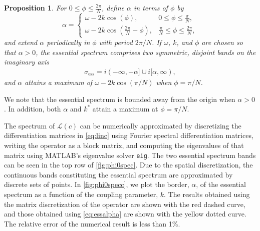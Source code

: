 \documentclass[11pt,reqno]{amsart}
\def\calL{{\mathcal L}}
\newtheorem{proposition}{Proposition}
\begin{document}
\begin{proposition}\label{prop:ess}
For $0 \leq \phi \leq \frac{2\pi}{N}$, define $\alpha$ in terms of $\phi$ by 
\begin{equation}\label{eq:essalpha}
\alpha = \begin{cases}
\omega - 2 k \cos\left(\phi\right), & 0 \leq \phi \leq \frac{\pi}{N}, \\
\omega - 2 k \cos\left(\frac{2\pi}{N}-\phi\right), & \frac{\pi}{N} \leq \phi \leq \frac{2\pi}{N},
\end{cases}
\end{equation}
and extend $\alpha$ periodically in $\phi$ with period $2 \pi/N$. If $\omega$, $k$, and $\phi$ are chosen so that $\alpha > 0$, the essential spectrum comprises two symmetric, disjoint bands on the imaginary axis
\begin{align}\label{eq:lessinterval}
\sigma_{\text{ess}} = i (-\infty, -\alpha] \cup i [\alpha, \infty),
\end{align}
and $\alpha$ attains a maximum of $\omega - 2 k \cos\left(\pi/N\right)$ when $\phi = \pi/N$.
\end{proposition}
We note that the essential spectrum is bounded away from the origin when $\alpha>0$. In addition, both $\alpha$ and $k^*$ attain a maximum at $\phi = \pi/N$. 

The spectrum of $\calL(c)$ can be numerically approximated by discretizing the differentiation matrices in \cref{eq:linc} using Fourier spectral differentiation matrices, writing the operator as a block matrix, and computing the eigenvalues of that matrix using MATLAB's eigenvalue solver \texttt{eig}. 
The two essential spectrum bands can be seen in the top row of \cref{fig:phi0spec}.
Due to the spatial discretization, the continuous bands constituting the essential spectrum are approximated by discrete sets of points. In \cref{fig:phi0specc}, we plot the border, $\alpha$, of the essential spectrum as a function of the coupling parameter, $k$. The results obtained using the matrix discretization of the operator are shown with the red dashed curve, and those obtained using \cref{eq:essalpha} are shown with the yellow dotted curve. The relative error of the numerical result is less than 1\%. 
\end{document}
